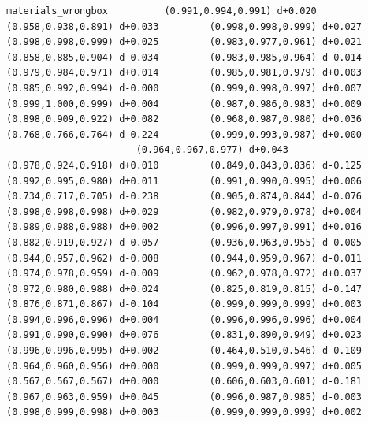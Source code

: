\documentclass[11pt, letterpaper, openany]{book}
\begin{document}
\begin{empiricalbox}
\begin{lstlisting}[style=terminal]
materials_wrongbox          (0.991,0.994,0.991) d+0.020         (0.958,0.938,0.891) d+0.033         (0.998,0.998,0.999) d+0.027         (0.998,0.998,0.999) d+0.025         (0.983,0.977,0.961) d+0.021         (0.858,0.885,0.904) d-0.034         (0.983,0.985,0.964) d-0.014         (0.979,0.984,0.971) d+0.014         (0.985,0.981,0.979) d+0.003         (0.985,0.992,0.994) d-0.000         (0.999,0.998,0.997) d+0.007         (0.999,1.000,0.999) d+0.004         (0.987,0.986,0.983) d+0.009         (0.898,0.909,0.922) d+0.082         (0.968,0.987,0.980) d+0.036         (0.768,0.766,0.764) d-0.224         (0.999,0.993,0.987) d+0.000                      -                      (0.964,0.967,0.977) d+0.043         (0.978,0.924,0.918) d+0.010         (0.849,0.843,0.836) d-0.125         (0.992,0.995,0.980) d+0.011         (0.991,0.990,0.995) d+0.006         (0.734,0.717,0.705) d-0.238         (0.905,0.874,0.844) d-0.076         (0.998,0.998,0.998) d+0.029         (0.982,0.979,0.978) d+0.004         (0.989,0.988,0.988) d+0.002         (0.996,0.997,0.991) d+0.016         (0.882,0.919,0.927) d-0.057         (0.936,0.963,0.955) d-0.005         (0.944,0.957,0.962) d-0.008         (0.944,0.959,0.967) d-0.011         (0.974,0.978,0.959) d-0.009         (0.962,0.978,0.972) d+0.037         (0.972,0.980,0.988) d+0.024         (0.825,0.819,0.815) d-0.147         (0.876,0.871,0.867) d-0.104         (0.999,0.999,0.999) d+0.003         (0.994,0.996,0.996) d+0.004         (0.996,0.996,0.996) d+0.004         (0.991,0.990,0.990) d+0.076         (0.831,0.890,0.949) d+0.023         (0.996,0.996,0.995) d+0.002         (0.464,0.510,0.546) d-0.109         (0.964,0.960,0.956) d+0.000         (0.999,0.999,0.997) d+0.005         (0.567,0.567,0.567) d+0.000         (0.606,0.603,0.601) d-0.181         (0.967,0.963,0.959) d+0.045         (0.996,0.987,0.985) d-0.003         (0.998,0.999,0.998) d+0.003         (0.999,0.999,0.999) d+0.002     

\end{lstlisting}
\end{empiricalbox}
\end{document}

